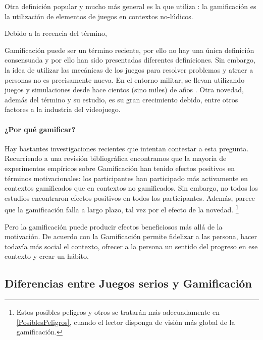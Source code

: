 Otra definición popular y mucho más general es la que utiliza  \cite{kwerb-WhatIs}: la gamificación es la utilización de elementos de juegos en contextos no-lúdicos.

Debido a la recencia del término,


Gamificación puede ser un término reciente, por ello no hay una única definición consensuada y por ello han sido presentadas diferentes definiciones.
%
Sin embargo, la idea de utilizar las mecánicas de los juegos para resolver problemas y atraer a personas no es precisamente nueva. 
%
En el entorno militar, se llevan utilizando juegos y simulaciones desde hace cientos (sino miles) de años  \cite{GamificationDefII}.
%
Otra novedad, además del término y su estudio, es su gran crecimiento debido, entre otros factores a la industria del videojuego.
%



\paragraph{¿Por qué gamificar?} Hay bastantes investigaciones recientes que intentan contestar a esta pregunta.
%
Recurriendo a una revisión bibliográfica  \cite{EmpiricalGamification} encontramos que la mayoría de experimentos empíricos sobre Gamificación han tenido efectos positivos en términos motivacionales: los participantes han participado más activamente en contextos gamificados que en contextos no gamificados.
%
Sin embargo, no todos los estudios encontraron efectos positivos en todos los participantes.
%
Además, parece que la gamificación falla a largo plazo, tal vez por el efecto de la novedad. 
%
\footnote{Estos posibles peligros y otros se tratarán más adecuadamente en \ref{PosiblesPeligros}, cuando el lector disponga de visión más global de la gamificación.}

Pero la gamificación puede producir efectos beneficiosos más allá de la motivación.
% 
De acuerdo con  \cite{kwerb-WhyGamify} la Gamificación permite fidelizar a las persona, hacer todavía más social el contexto, ofrecer a la persona un sentido del progreso en ese contexto y crear un hábito.


\subsection{Diferencias entre Juegos serios y Gamificación}

